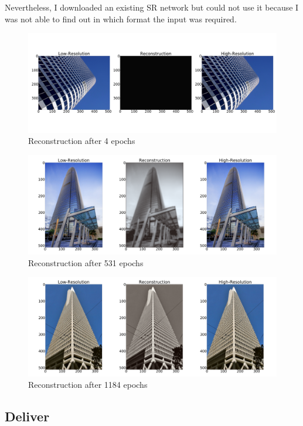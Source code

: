 \documentclass[]{article}
\begin{document}
Nevertheless, I downloaded an existing SR network but could not use it
because I was not able to find out in which format the input was
required.

\begin{figure}
\centering
\includegraphics{4_psnr_7.png}
\caption{Reconstruction after 4 epochs\label{epochs_low}}
\end{figure}

\begin{figure}
\centering
\includegraphics{531_psnr_17.png}
\caption{Reconstruction after 531 epochs\label{epochs_medium}}
\end{figure}

\begin{figure}
\centering
\includegraphics{1184_psnr_15.png}
\caption{Reconstruction after 1184 epochs\label{epochs_high}}
\end{figure}

\hypertarget{deliver}{%
\subsection{Deliver}\label{deliver}}
\end{document}
